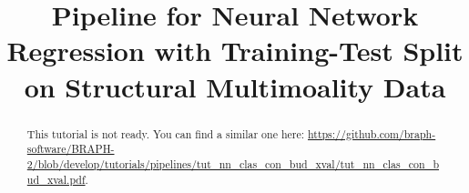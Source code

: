 \documentclass[justified]{tufte-handout}
\title[Regression Training-Test Split Structural Multimoality Data]{Pipeline for Neural Network Regression with Training-Test Split on Structural Multimoality Data}
\begin{document}
\maketitle

\begin{abstract}
\noindent
This tutorial is not ready. You can find a similar one here: \url{https://github.com/braph-software/BRAPH-2/blob/develop/tutorials/pipelines/tut_nn_clas_con_bud_xval/tut_nn_clas_con_bud_xval.pdf}.
\end{abstract}
\end{document}
